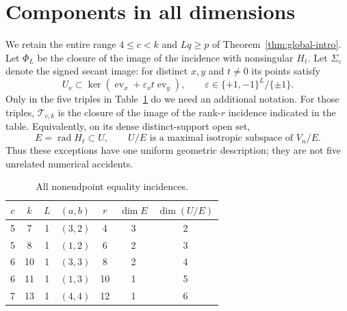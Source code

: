 \section{Components in all dimensions}\label{sec:all-dimensions}
We retain the entire range $4\le c<k$ and $Lq\ge p$ of
Theorem~\ref{thm:global-intro}. Let $\Phi_L$ be the closure of the
image of the incidence with nonsingular $H_\ell$. Let
$\Sigma_\varepsilon$ denote the signed secant image: for distinct $x,y$
and $t\ne0$ its points satisfy
\[
 U_\nu\subset\ker(\operatorname{ev}_x+
          \varepsilon_\nu t\operatorname{ev}_y),\qquad
 \varepsilon\in\{+1,-1\}^L/\{\pm1\}.
\]
Only in the five triples in Table~\ref{tab:exceptions} do we need an
additional notation. For those triples, $\mathcal T_{c,k}$ is the
closure of the image of the rank-$r$ incidence indicated in the table.
Equivalently, on its dense distinct-support open set,
\[
 E=\operatorname{rad}H_\ell\subset U,\qquad
 U/E\text{ is a maximal isotropic subspace of }V_n/E.
\]
Thus these exceptions have one uniform geometric description; they are
not five unrelated numerical accidents.

\begin{table}[ht]
\centering
\begin{tabular}{ccccccc}
\toprule
$c$&$k$&$L$&$(a,b)$&$r$&$\dim E$&$\dim(U/E)$\\
\midrule
5&7&1&$(3,2)$&4&3&2\\
5&8&1&$(1,2)$&6&2&3\\
6&10&1&$(3,3)$&8&2&4\\
6&11&1&$(1,3)$&10&1&5\\
7&13&1&$(4,4)$&12&1&6\\
\bottomrule
\end{tabular}
\caption{All nonendpoint equality incidences.}\label{tab:exceptions}
\end{table}

